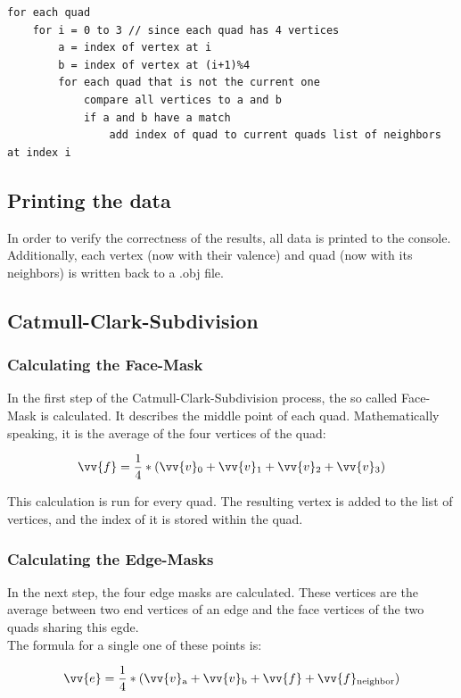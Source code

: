 \documentclass[12pt,a4paper]{scrartcl}
\begin{document}
\begin{lstlisting}[language=PSEUDO]
for each quad
	for i = 0 to 3 // since each quad has 4 vertices
		a = index of vertex at i
		b = index of vertex at (i+1)%4
		for each quad that is not the current one
			compare all vertices to a and b
			if a and b have a match
				add index of quad to current quads list of neighbors at index i 
\end{lstlisting}

\subsection{Printing the data}
In order to verify the correctness of the results, all data is printed to the console. Additionally, each vertex (now with their valence) and quad (now with its neighbors) is written back to a .obj file.

\subsection{Catmull-Clark-Subdivision}

\subsubsection{Calculating the Face-Mask}
In the first step of the Catmull-Clark-Subdivision process, the so called Face-Mask is calculated. It describes the middle point of each quad. Mathematically speaking, it is the average of the four vertices of the quad:

$$ \vv{f} = \frac{1}{4}*( \vv{v}\textsubscript{0} + \vv{v}\textsubscript{1} + \vv{v}\textsubscript{2} + \vv{v}\textsubscript{3}) $$

This calculation is run for every quad. The resulting vertex is added to the list of vertices, and the index of it is stored within the quad.

\subsubsection{Calculating the Edge-Masks}
In the next step, the four edge masks are calculated. These vertices are the average between two end vertices of an edge and the face vertices of the two quads sharing this egde.\\
The formula for a single one of these points is:

$$ \vv{e} = \frac{1}{4} * (\vv{v}\textsubscript{a} + \vv{v}\textsubscript{b} + \vv{f} + \vv{f}\textsubscript{neighbor}) $$
\end{document}
